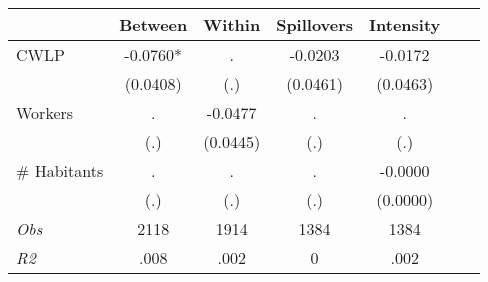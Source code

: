 \begin{tabular}{l*{6}{c}}\hline&\multicolumn{1}{c}{Between}&\multicolumn{1}{c}{Within}&\multicolumn{1}{c}{Spillovers}&\multicolumn{1}{c}{Intensity}\\ \hline 
CWLP & -0.0760* & . & -0.0203 & -0.0172 \\
 & (0.0408) & (.) & (0.0461) & (0.0463) \\
Workers & . & -0.0477 & . & . \\
 & (.) & (0.0445) & (.) & (.) \\
\# Habitants & . & . & . & -0.0000 \\
  & (.) & (.) & (.) & (0.0000) \\
\hline \textit{Obs} & 2118 & 1914 & 1384 & 1384  \\ \textit{R2} & .008 & .002 & 0 & .002 \\ \hline \end{tabular}
